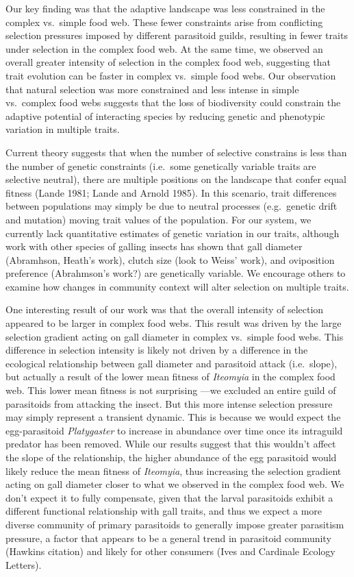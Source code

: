 \documentclass[]{elsarticle} %
\begin{document}
Our key finding was that the adaptive landscape was less constrained in
the complex vs.~simple food web. These fewer constraints arise from
conflicting selection pressures imposed by different parasitoid guilds,
resulting in fewer traits under selection in the complex food web. At
the same time, we observed an overall greater intensity of selection in
the complex food web, suggesting that trait evolution can be faster in
complex vs.~simple food webs. Our observation that natural selection was
more constrained and less intense in simple vs.~complex food webs
suggests that the loss of biodiversity could constrain the adaptive
potential of interacting species by reducing genetic and phenotypic
variation in multiple traits.

Current theory suggests that when the number of selective constrains is
less than the number of genetic constraints (i.e.~some genetically
variable traits are selective neutral), there are multiple positions on
the landscape that confer equal fitness (Lande 1981; Lande and Arnold
1985). In this scenario, trait differences between populations may
simply be due to neutral processes (e.g.~genetic drift and mutation)
moving trait values of the population. For our system, we currently lack
quantitative estimates of genetic variation in our traits, although work
with other species of galling insects has shown that gall diameter
(Abramhson, Heath's work), clutch size (look to Weiss' work), and
oviposition preference (Abrahmson's work?) are genetically variable. We
encourage others to examine how changes in community context will alter
selection on multiple traits.

One interesting result of our work was that the overall intensity of
selection appeared to be larger in complex food webs. This result was
driven by the large selection gradient acting on gall diameter in
complex vs.~simple food webs. This difference in selection intensity is
likely not driven by a difference in the ecological relationship between
gall diameter and parasitoid attack (i.e.~slope), but actually a result
of the lower mean fitness of \emph{Iteomyia} in the complex food web.
This lower mean fitness is not surprising ---we excluded an entire guild
of parasitoids from attacking the insect. But this more intense
selection pressure may simply represent a transient dynamic. This is
because we would expect the egg-parasitoid \emph{Platygaster} to
increase in abundance over time once its intraguild predator has been
removed. While our results suggest that this wouldn't affect the slope
of the relationship, the higher abundance of the egg parasitoid would
likely reduce the mean fitness of \emph{Iteomyia}, thus increasing the
selection gradient acting on gall diameter closer to what we observed in
the complex food web. We don't expect it to fully compensate, given that
the larval parasitoids exhibit a different functional relationship with
gall traits, and thus we expect a more diverse community of primary
parasitoids to generally impose greater parasitism pressure, a factor
that appears to be a general trend in parasitoid community (Hawkins
citation) and likely for other consumers (Ives and Cardinale Ecology
Letters).
\end{document}
